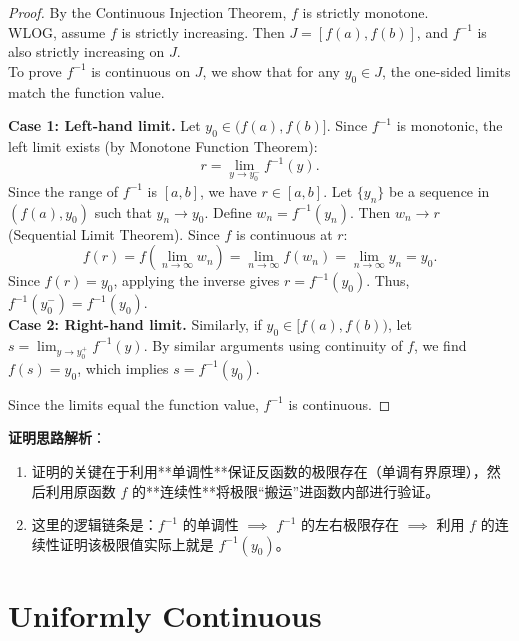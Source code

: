 \documentclass[
	UTF-8,
	11pt, %
	a4paper, %
]{LegrandOrangeBook}
\begin{document}
    \begin{proof}
    By the Continuous Injection Theorem, $f$ is strictly monotone. \\

    WLOG, assume $f$ is strictly increasing. Then $J = [f(a), f(b)]$, 
    and $f^{-1}$ is also strictly increasing on $J$.\\

    To prove $f^{-1}$ is continuous on $J$, we show that for any $y_0 \in J$, the one-sided limits match the function value.

    \textbf{Case 1: Left-hand limit.}
    Let $y_0 \in (f(a), f(b)]$.
    Since $f^{-1}$ is monotonic, the left limit exists (by Monotone Function Theorem):
    \[ r = \lim_{y \to y_0^-} f^{-1}(y). \]
    Since the range of $f^{-1}$ is $[a, b]$, we have $r \in [a, b]$.
    Let $\{y_n\}$ be a sequence in $(f(a), y_0)$ such that $y_n \to y_0$. Define $w_n = f^{-1}(y_n)$.
    Then $w_n \to r$ (Sequential Limit Theorem).
    Since $f$ is continuous at $r$:
    \[ f(r) = f(\lim_{n \to \infty} w_n) = \lim_{n \to \infty} f(w_n) = \lim_{n \to \infty} y_n = y_0. \]
    Since $f(r) = y_0$, applying the inverse gives $r = f^{-1}(y_0)$.
    Thus, $f^{-1}(y_0^-) = f^{-1}(y_0)$.\\

    \textbf{Case 2: Right-hand limit.}
    Similarly, if $y_0 \in [f(a), f(b))$, let $s = \lim_{y \to y_0^+} f^{-1}(y)$.
    By similar arguments using continuity of $f$, we find $f(s) = y_0$, which implies $s = f^{-1}(y_0)$.

    Since the limits equal the function value, $f^{-1}$ is continuous.
    \end{proof}

    \begin{remark}
    \textbf{证明思路解析}：
    \begin{enumerate}
        \item 证明的关键在于利用**单调性**保证反函数的极限存在（单调有界原理），然后利用原函数 $f$ 的**连续性**将极限“搬运”进函数内部进行验证。
        \item 这里的逻辑链条是：$f^{-1}$ 的单调性 $\implies$ $f^{-1}$ 的左右极限存在 $\implies$ 利用 $f$ 的连续性证明该极限值实际上就是 $f^{-1}(y_0)$。
    \end{enumerate}
    \end{remark}

    \newpage

    \section{Uniformly Continuous}
\end{document}
